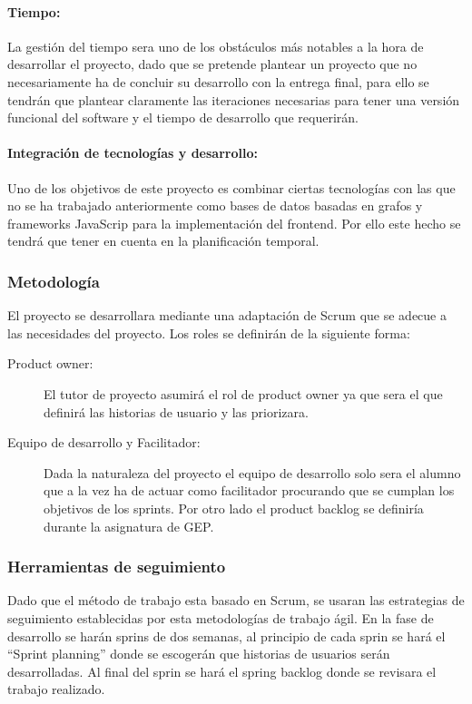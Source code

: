 \documentclass[12pt]{article} %
\begin{document}
\paragraph{Tiempo:}
La gestión del tiempo sera uno de los obstáculos más notables a la hora de desarrollar el proyecto, dado que se pretende plantear un proyecto que no necesariamente ha de concluir su desarrollo con la entrega final, para ello se tendrán que plantear claramente las iteraciones necesarias para tener una versión funcional del software y el tiempo de desarrollo que requerirán.
\paragraph{Integración de tecnologías y desarrollo:}
Uno de los objetivos de este proyecto es combinar ciertas tecnologías con las que no se ha trabajado anteriormente como bases de datos basadas en grafos y frameworks JavaScrip para la implementación del frontend. Por ello este hecho se tendrá que tener en cuenta en la planificación temporal.

\subsubsection{Metodología}
El proyecto se desarrollara mediante una adaptación de Scrum que se adecue a las necesidades del proyecto.
Los roles se definirán de la siguiente forma:
\begin{description}
\item[Product owner:] El tutor de proyecto asumirá el rol de product owner ya que sera el que definirá las historias de usuario y las priorizara.
\item[Equipo de desarrollo y Facilitador:] Dada la naturaleza del proyecto el equipo de desarrollo solo sera el alumno que a la vez ha de actuar como facilitador procurando que se cumplan los objetivos de los sprints.
Por otro lado el product backlog se definiría durante la asignatura de GEP.
\end{description}

\subsubsection{Herramientas de seguimiento}
Dado que el método de trabajo esta basado en Scrum, se usaran las estrategias de seguimiento establecidas por esta metodologías  de trabajo ágil.
En la fase de desarrollo se harán sprins de dos semanas, al principio de cada sprin se hará el “Sprint planning” donde se escogerán que historias de usuarios serán desarrolladas. Al final del sprin se hará el spring backlog donde se revisara el trabajo realizado.

\newpage


\nocite{*}

\end{document}
